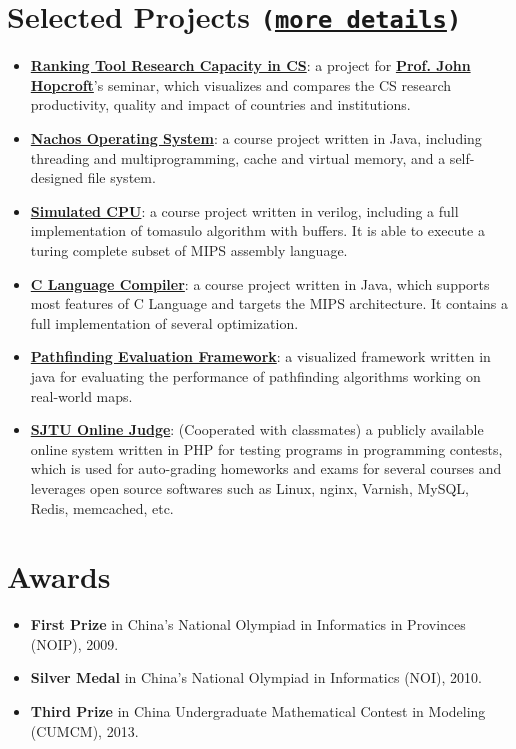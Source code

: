 \documentclass[letterpaper]{article}
\begin{document}
\section*{Selected Projects \normalsize{\tt(\href{https://github.com/lostleaf?tab=repositories}{more details})}}
\begin{itemize}
\item \textbf{\href{http://acm.sjtu.edu.cn/ricsrt/}{Ranking Tool Research Capacity in CS}}:
a project for \textbf{\href{http://www.cs.cornell.edu/jeh/}{Prof. John Hopcroft}}'s seminar, which visualizes and compares the CS research productivity, quality and impact of countries and institutions.
\item \textbf{\href{https://github.com/lostleaf/nachos}{Nachos Operating System}}: 
a course project written in Java, including threading and multiprogramming, cache and virtual memory, and a self-designed file system.
\item \textbf{\href{https://github.com/lostleaf/cpu}{Simulated CPU}}:
a course project written in verilog, including a full implementation of tomasulo algorithm with buffers. It is able to execute a turing complete subset of MIPS assembly language.
\item \textbf{\href{https://github.com/lostleaf/compiler}{C Language Compiler}}:
a course project written in Java, which supports most features of C Language and targets the MIPS architecture. It contains a full implementation of several optimization.
\item \textbf{\href{https://github.com/lostleaf/Pathfinding-Evaluation}{Pathfinding Evaluation Framework}}:
a visualized framework written in java for evaluating the performance of pathfinding algorithms working on real-world maps.
\item \textbf{\href{http://acm.sjtu.edu.cn/OnlineJudge/}{SJTU Online Judge}}: (Cooperated with classmates) a publicly available online system written in PHP for testing programs in programming contests, which is used for auto-grading homeworks and exams for several courses and leverages open source softwares such as Linux, nginx, Varnish, MySQL, Redis, memcached, etc.
\end{itemize}

\section*{Awards}
\begin{itemize}
\item  \textbf{First Prize} in China's National Olympiad in Informatics in Provinces (NOIP), 2009. 
\item  \textbf{Silver Medal} in China's National Olympiad in Informatics (NOI), 2010. 
\item  \textbf{Third Prize} in China Undergraduate Mathematical Contest in Modeling (CUMCM), 2013. 
\end{itemize}
\end{document}
